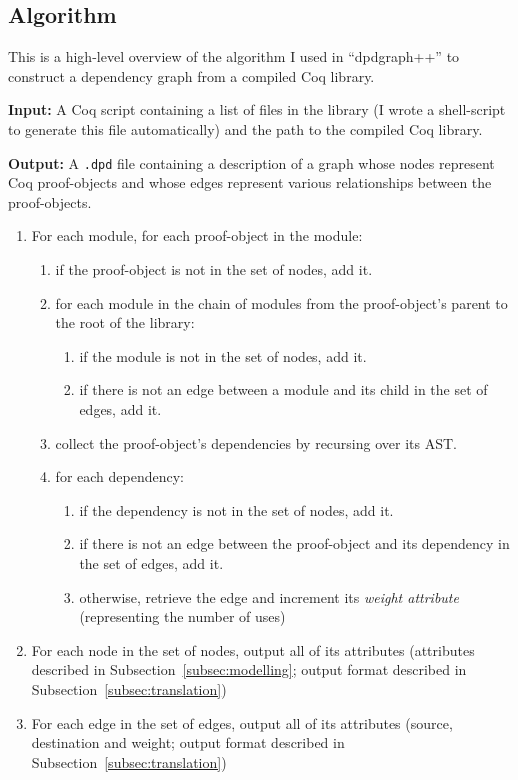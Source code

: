 \subsection{Algorithm}

This is a high-level overview of the algorithm I used in ``dpdgraph++'' to
construct a dependency graph from a compiled Coq library.

\textbf{Input:} A Coq script containing a list of files in the library (I wrote
a shell-script to generate this file automatically) and the path to the compiled
Coq library.

\textbf{Output:} A \texttt{.dpd} file containing a description of a graph whose
nodes represent Coq proof-objects and whose edges represent various
relationships between the proof-objects.

\begin{enumerate}

  \item For each module, for each proof-object in the module:

    \begin{enumerate}
      \item if the proof-object is not in the set of nodes, add it.
      \item for each module in the chain of modules from the proof-object's parent
        to the root of the library: 
        \begin{enumerate}
          \item if the module is not in the set of nodes, add it.
          \item if there is not an edge between a module and its child in the
            set of edges, add it.
        \end{enumerate}
      \item collect the proof-object's dependencies by recursing over its AST.
      \item for each dependency: 
        \begin{enumerate} 
          \item if the dependency is not in the set of nodes, add it.
          \item if there is not an edge between the proof-object and its
            dependency in the set of edges, add it.
          \item otherwise, retrieve the edge and increment its \emph{weight
            attribute} (representing the number of uses)
        \end{enumerate}
    \end{enumerate}
  
  \item For each node in the set of nodes, output all of its attributes
    (attributes described in Subsection~\ref{subsec:modelling}; output format described in
    Subsection~\ref{subsec:translation})

  \item For each edge in the set of edges, output all of its attributes (source,
    destination and weight; output format described in
    Subsection~\ref{subsec:translation})

\end{enumerate}

